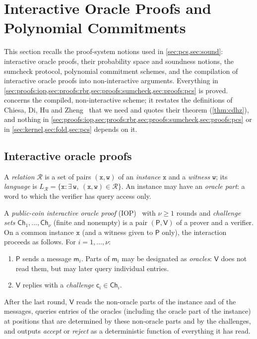 \section{Interactive Oracle Proofs and Polynomial Commitments}\label{sec:proofs}

This section recalls the proof-system notions used in \cref{sec:pcs,sec:sound}: interactive oracle proofs, their probability space and soundness notions, the sumcheck protocol, polynomial commitment schemes, and the compilation of interactive oracle proofs into non-interactive arguments.
Everything in \cref{sec:proofs:iop,sec:proofs:rbr,sec:proofs:sumcheck,sec:proofs:pcs} is proved.
 concerns the compiled, non-interactive scheme; it restates the definitions of Chiesa, Di, Hu and Zheng~\cite{CDHZ25} that we need and quotes their theorem (\cref{thm:cdhz}), and nothing in \cref{sec:proofs:iop,sec:proofs:rbr,sec:proofs:sumcheck,sec:proofs:pcs} or in \cref{sec:kernel,sec:fold,sec:pcs} depends on it.

\subsection{Interactive oracle proofs}\label{sec:proofs:iop}

A \emph{relation} $\mathcal{R}$ is a set of pairs $(\mathtt{x},\mathtt{w})$ of an \emph{instance} $\mathtt{x}$ and a \emph{witness} $\mathtt{w}$; its \emph{language} is $L_{\mathcal{R}} = \{\mathtt{x} : \exists\, \mathtt{w},\ (\mathtt{x},\mathtt{w}) \in \mathcal{R}\}$.
An instance may have an \emph{oracle part}: a word to which the verifier has query access only.

\begin{definition}\label{def:iop}
A \emph{public-coin interactive oracle proof} (IOP)~\cite{BCS16} with $\nu \ge 1$ rounds and \emph{challenge sets} $\mathsf{Ch}_1,\dots,\mathsf{Ch}_\nu$ (finite and nonempty) is a pair $(\mathsf{P},\mathsf{V})$ of a prover and a verifier.
On a common instance $\mathtt{x}$ (and a witness given to $\mathsf{P}$ only), the interaction proceeds as follows. For $i = 1, \dots, \nu$:
\begin{enumerate}
  \item $\mathsf{P}$ sends a message $\mathsf{m}_i$. Parts of $\mathsf{m}_i$ may be designated as \emph{oracles}: $\mathsf{V}$ does not read them, but may later query individual entries.
  \item $\mathsf{V}$ replies with a \emph{challenge} $\mathsf{c}_i \in \mathsf{Ch}_i$.
\end{enumerate}
After the last round, $\mathsf{V}$ reads the non-oracle parts of the instance and of the messages, queries entries of the oracles (including the oracle part of the instance) at positions that are determined by these non-oracle parts and by the challenges, and outputs \emph{accept} or \emph{reject} as a deterministic function of everything it has read.
\end{definition}

